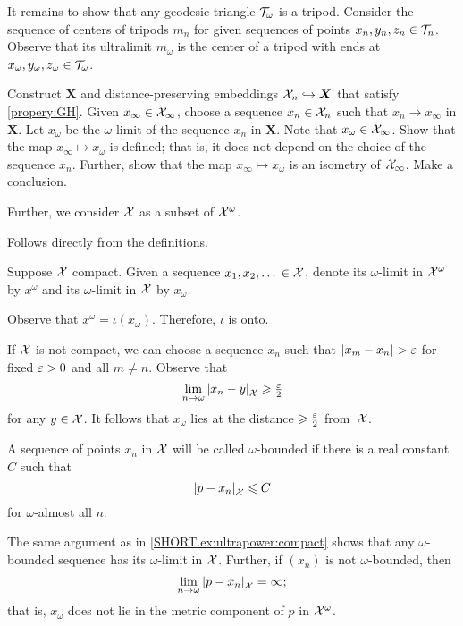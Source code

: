 It remains to show that any geodesic triangle $\mathcal{T}_\omega$ is a tripod.
Consider the sequence of centers of tripods $m_n$ for given sequences of points $x_n,y_n,z_n\in \mathcal{T}_n$.
Observe that its ultralimit $m_\omega$ is the center of a tripod with ends at $x_\omega,y_\omega,z_\omega\in \mathcal{T}_\omega$.

Construct $\bm{X}$ and distance-preserving embeddings $\mathcal{X}_n\hookrightarrow\bm{X}$ that satisfy \ref{propery:GH}.
Given $x_\infty\in \mathcal{X}_\infty$, choose a sequence $x_n\in \mathcal{X}_n$ such that $x_n\to x_\infty$ in $\bm{X}$.
Let $x_\omega$ be the $\omega$-limit of the sequence $x_n$ in $\bm{X}$.
Note that $x_\omega\in \mathcal{X}_\infty$.
Show that the map $x_\infty\mapsto x_\omega$ is defined; that is, it does not depend on the choice of the sequence $x_n$.
Further, show that the map $x_\infty\mapsto x_\omega$ is an isometry of $\mathcal{X}_\infty$.
Make a conclusion.

Further, we consider $\mathcal{X}$ as a subset of $\mathcal{X}^\omega$.

 Follows directly from the definitions.

Suppose $\mathcal{X}$ compact.
Given a sequence $x_1,x_2,\dots{}\in\mathcal{X}$, denote its $\omega$-limit in $\mathcal{X}^\omega$ by $x^\omega$ and its $\omega$-limit in $\mathcal{X}$ by $x_\omega$.

Observe that $x^\omega=\iota(x_\omega)$.
Therefore, $\iota$ is onto.

If $\mathcal{X}$ is not compact, we can choose a sequence $x_n$ such that $\dist{x_m}{x_n}{}>\eps$ for fixed $\varepsilon>0$ and all $m\ne n$.
Observe that
\[\lim_{n\to\omega}\dist{x_n}{y}{\spc{X}}\ge \tfrac\eps2\]
for any $y\in\mathcal{X}$.
It follows that $x_\omega$ lies at the distance $\geqslant\tfrac{\varepsilon}2$ from~$\mathcal{X}$.

A sequence of points $x_n$ in $\mathcal{X}$ will be called $\omega$-bounded if there is a real constant $C$ such that
\[\dist{p}{x_n}{\spc{X}}\le C\] 
for $\omega$-almost all $n$.

The same argument as in \ref{SHORT.ex:ultrapower:compact} shows that any $\omega$-bounded sequence has its $\omega$-limit in $\mathcal{X}$.
Further, if $(x_n)$ is not  $\omega$-bounded, then 
\[\lim_{n\to\omega}\dist{p}{x_n}{\spc{X}}=\infty;\]
that is, $x_\omega$ does not lie in the metric component of $p$ in $\mathcal{X}^\omega$.

